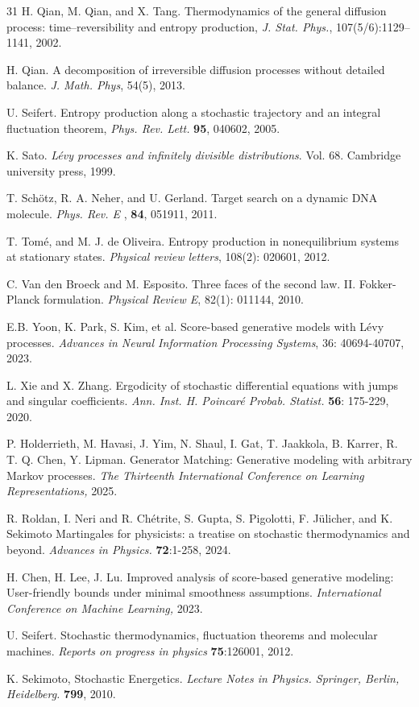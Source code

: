 \documentclass[10pt]{article}
\theoremstyle{definition}
\theoremstyle{remark}
\numberwithin{equation}{section}
\begin{document}
\begin{thebibliography}{31}
 H. Qian, M. Qian, and X. Tang. Thermodynamics of the general diffusion process: time–reversibility and entropy production, { \it J. Stat. Phys.},
107(5/6):1129–1141, 2002.

 H. Qian. A decomposition of irreversible diffusion processes without detailed balance. { \it  J. Math. Phys}, 54(5), 2013.

 U. Seifert. Entropy production along a stochastic trajectory and an integral fluctuation theorem, {\it Phys. Rev. Lett.} {\bf 95}, 040602, 2005.

 K. Sato. {\it Lévy processes and infinitely divisible distributions}. Vol. 68. Cambridge university press, 1999.

 T. Sch\"{o}tz, R. A. Neher, and U. Gerland. Target search on a dynamic DNA molecule. {\it Phys. Rev. E }, {\bf 84}, 051911, 2011.

 T. Tomé, and M. J. de Oliveira. Entropy production in nonequilibrium systems at stationary states. {\it  Physical review letters}, 108(2): 020601, 2012.

 C. Van den Broeck and M. Esposito. Three faces of the second law. II. Fokker-Planck formulation. {\it  Physical Review E}, 82(1): 011144, 2010.

 E.B. Yoon, K. Park, S. Kim, et al.  Score-based generative models with Lévy processes. {\it Advances in Neural Information Processing Systems}, 36: 40694-40707, 2023.

 L. Xie and  X. Zhang. Ergodicity of stochastic differential equations with jumps and singular coefficients. {\it Ann. Inst. H. Poincar\'{e} Probab. Statist.}  {\bf 56}: 175-229, 2020.

 P. Holderrieth, M. Havasi, J. Yim, N. Shaul, I. Gat, T. Jaakkola, B. Karrer, R. T. Q. Chen, Y. Lipman. Generator Matching: Generative modeling with arbitrary Markov processes. {\it The Thirteenth International Conference on Learning Representations,} 2025.

 R. Roldan, I. Neri and R. Ch{\'e}trite, S. Gupta, S. Pigolotti, F. J{\"u}licher, and K. Sekimoto
Martingales for physicists: a treatise on stochastic thermodynamics and beyond. {\it Advances in Physics.} {\bf 72}:{1-258}, 2024.

 H. Chen, H. Lee, J. Lu. Improved analysis of score-based generative modeling: User-friendly bounds under minimal smoothness assumptions. {\it International Conference on Machine Learning,} 2023.

 U. Seifert. Stochastic thermodynamics, fluctuation theorems and molecular machines. {\it Reports on progress in physics} {\bf 75}:126001, 2012.

 K. Sekimoto, Stochastic Energetics. {\it Lecture Notes in Physics. Springer, Berlin, Heidelberg. } {\bf 799}, 2010.




\end{thebibliography}
\end{document}
